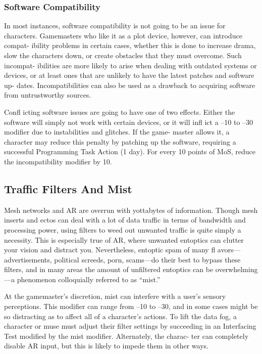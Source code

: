 \subsubsection{Software Compatibility}

In most instances, software compatibility is not going 
to be an issue for characters. Gamemasters who like 
it as a plot device, however, can introduce compat-
ibility problems in certain cases, whether this is done 
to increase drama, slow the characters down, or create 
obstacles that they must overcome. Such incompat-
ibilities are more likely to arise when dealing with 
outdated systems or devices, or at least ones that are 
unlikely to have the latest patches and software up-
dates. Incompatibilities can also be used as a drawback 
to acquiring software from untrustworthy sources.

Confl icting software issues are going to have one of 
two effects. Either the software will simply not work 
with certain devices, or it will infl ict a –10 to –30 
modifier due to instabilities and glitches. If the game-
master allows it, a character may reduce this penalty 
by patching up the software, requiring a successful 
Programming Task Action (1 day). For every 10 points 
of MoS, reduce the incompatibility modifier by 10.

\subsection{Traffic Filters And Mist}

Mesh networks and AR are overrun with yottabytes of 
information. Though mesh inserts and ectos can deal 
with a lot of data traffic in terms of bandwidth and 
processing power, using filters to weed out unwanted 
traffic is quite simply a necessity. This is especially true 
of AR, where unwanted entoptics can clutter your 
vision and distract you. Nevertheless, entoptic spam of 
many fl avors—advertisements, political screeds, porn, 
scams—do their best to bypass these filters, and in 
many areas the amount of unfiltered entoptics can be 
overwhelming—a phenomenon colloquially referred 
to as ``mist.''

At the gamemaster's discretion, mist can interfere 
with a user's sensory perceptions. This modifier can 
range from –10 to –30, and in some cases might be 
so distracting as to affect all of a character's actions. 
To lift the data fog, a character or muse must adjust 
their filter settings by succeeding in an Interfacing Test 
modified by the mist modifier. Alternately, the charac-
ter can completely disable AR input, but this is likely 
to impede them in other ways.


